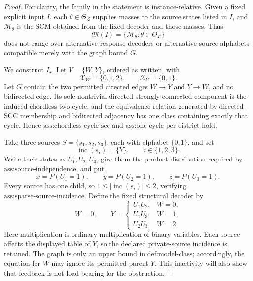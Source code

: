 \documentclass{article}
\begin{document}
\begin{proof}
For clarity, the family in the statement is instance-relative.  Given a fixed explicit input \(I\), each \(\theta\in\Theta_{\mathcal L}\) supplies masses to the source states listed in \(I\), and \(\mathcal M_\theta\) is the SCM obtained from the fixed decoder and those masses.  Thus
\[
 \mathfrak M(I)=\{\mathcal M_\theta:\theta\in\Theta_{\mathcal L}\}
\]
does not range over alternative response decoders or alternative source alphabets compatible merely with the graph bound \(G\).

We construct \(I_\star\).  Let \(V=\{W,Y\}\), ordered as written, with
\[
 \mathcal X_W=\{0,1,2\},\qquad \mathcal X_Y=\{0,1\}.
\]
Let \(G\) contain the two permitted directed edges \(W\to Y\) and \(Y\to W\), and no bidirected edge.  Its sole nontrivial directed strongly connected component is the induced chordless two-cycle, and the equivalence relation generated by directed-SCC membership and bidirected adjacency has one class containing exactly that cycle.  Hence \(\text{ass:chordless-cycle-scc}\) and \(\text{ass:one-cycle-per-district}\) hold.

Take three sources \(S=\{s_1,s_2,s_3\}\), each with alphabet \(\{0,1\}\), and set
\[
 \operatorname{inc}(s_i)=\{Y\},\qquad i\in\{1,2,3\}.
\]
Write their states as \(U_1,U_2,U_3\), give them the product distribution required by \(\text{ass:source-independence}\), and put
\[
 x=P(U_1=1),\qquad y=P(U_2=1),\qquad z=P(U_3=1).
\]
Every source has one child, so \(1\leq |\operatorname{inc}(s_i)|\leq2\), verifying \(\text{ass:sparse-source-incidence}\).  Define the fixed structural decoder by
\[
 W=0,
 \qquad
 Y=
 \begin{cases}
 U_1U_2,&W=0,\\
 U_1U_3,&W=1,\\
 U_2U_3,&W=2.
 \end{cases}
 \tag{1}
\]
Here multiplication is ordinary multiplication of binary variables.  Each source affects the displayed table of \(Y\), so the declared private-source incidence is retained.  The graph is only an upper bound in \(\text{def:model-class}\); accordingly, the equation for \(W\) may ignore its permitted parent \(Y\).  This inactivity will also show that feedback is not load-bearing for the obstruction.


\end{proof}
\end{document}
